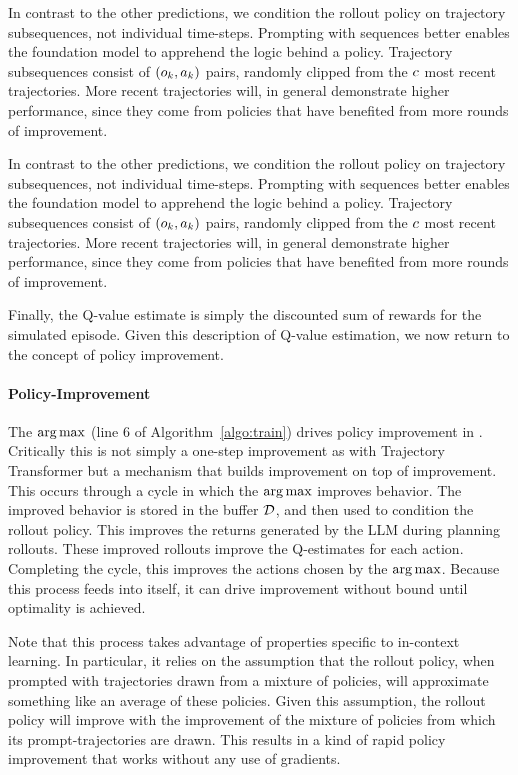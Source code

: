 \documentclass{article}
\begin{document}
In contrast to the other predictions, we condition the rollout policy on
trajectory subsequences, not individual time-steps. Prompting with sequences
better enables the foundation model to apprehend the logic behind a policy. Trajectory
subsequences consist of $(\Obs_{k}, \Act_{k})$ pairs, randomly clipped from
the $c$ most recent trajectories. More recent trajectories will, in
general demonstrate higher performance, since they come from policies that have
benefited from more rounds of improvement.

In contrast to the other predictions, we condition the rollout policy on
trajectory subsequences, not individual time-steps. Prompting with sequences
better enables the foundation model to apprehend the logic behind a policy. Trajectory
subsequences consist of $(\Obs_{k}, \Act_{k})$ pairs, randomly clipped from
the $c$ most recent trajectories. More recent trajectories will, in
general demonstrate higher performance, since they come from policies that have
benefited from more rounds of improvement.

Finally, the Q-value estimate is simply the discounted sum of rewards for the
simulated episode. Given this description of Q-value estimation, we now return
to the concept of policy improvement.

\lstset{style=mystyle}
\def\graycolor{\color{lightgray}}
\def\blackcolor{\color{black}}


\paragraph{Policy-Improvement} The $\arg\max$ (line 6 of
Algorithm~\ref{algo:train}) drives policy improvement in \Algorithm{}.
Critically this is not simply a one-step improvement as with Trajectory
Transformer \parencite{janner_offline_2021} but a mechanism that builds improvement
on top of improvement. This occurs through a cycle in which the $\arg\max$
improves behavior. The improved behavior is stored in the buffer $\mathcal{D}$, and
then used to condition the rollout policy. This improves the returns generated
by the LLM during planning rollouts. These improved rollouts improve the
Q-estimates for each action. Completing the cycle, this improves the actions
chosen by the $\arg\max$. Because this process feeds into itself, it can drive
improvement without bound until optimality is achieved.


Note that this process takes advantage of properties specific to in-context
learning. In particular, it relies on the assumption that the rollout policy,
when prompted with trajectories drawn from a mixture of policies, will
approximate something like an average of these policies. Given this
assumption, the rollout policy will improve with the improvement of the
mixture of policies from which its prompt-trajectories are drawn. This
results in a kind of rapid policy improvement that works without any use of
gradients.
\end{document}
